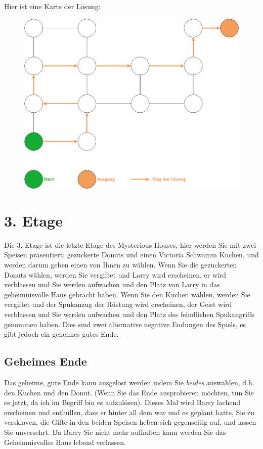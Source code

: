 \documentclass{article}
\begin{document}
\newpage
Hier ist eine Karte der L\"{o}sung:

\begin{figure}[htb]
	\centering
	\includegraphics[width=4.5in]{Floor2-Solution.png}
\end{figure}

\section*{3. Etage}
Die 3. Etage ist die letzte Etage des Mysterious Houses, hier werden Sie mit zwei Speisen pr\"{a}sentiert: gezuckerte Donuts und einen Victoria Schwamm Kuchen, und werden darum geben einen von Ihnen zu w\"{a}hlen. Wenn Sie die gezuckerten Donuts w\"{a}hlen, werden Sie vergiftet und Larry wird erscheinen, er wird verblassen und Sie werden aufwachen und den Platz von Larry in das geheimnisvolle Haus gebracht haben. Wenn Sie den Kuchen w\"{a}hlen, werden Sie vergiftet und der Spukanzug der R\"{u}stung wird erscheinen, der Geist wird verblassen und Sie werden aufwachen und den Platz des feindlichen Spukangriffs genommen haben. Dies sind zwei alternative negative Endungen des Spiels, es gibt jedoch ein geheimes gutes Ende.

\subsection*{Geheimes Ende}
Das geheime, gute Ende kann ausgel\"{o}st werden indem Sie \textit{beides} ausw\"{a}hlen, d.h. den Kuchen und den Donut.
(Wenn Sie das Ende ausprobieren m\"{o}chten, tun Sie es jetzt, da ich im Begriff bin es aufzul\"{o}sen).
Dieses Mal wird Barry lachend erscheinen und enth\"{u}llen, dass er hinter all dem war und es geplant hatte, Sie zu versklaven, die Gifte in den beiden Speisen heben sich gegenseitig auf, und lassen Sie unversehrt. Da Barry Sie nicht mehr aufhalten kann werden Sie das Geheimnisvolles Haus lebend verlassen.
\end{document}
